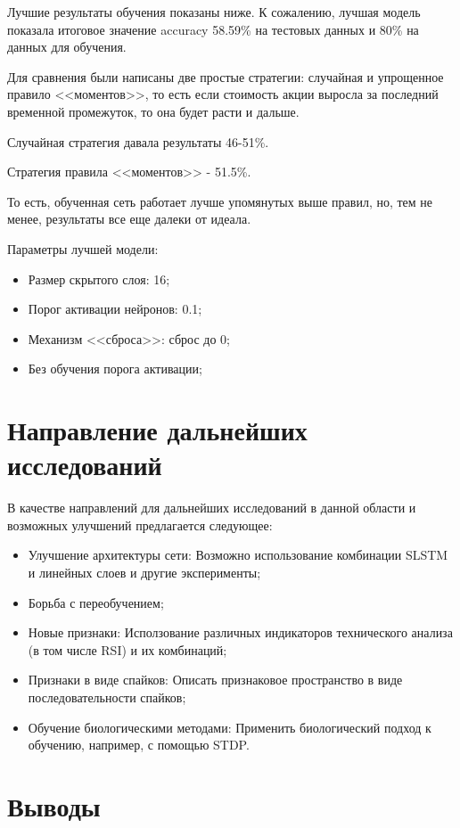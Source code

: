 \documentclass[a4paper,fontsize=12pt,titlepage,final]{scrartcl}
\begin{document}
Лучшие результаты обучения показаны ниже. К сожалению, лучшая модель показала итоговое значение accuracy 58.59\% на тестовых данных и 80\% на данных для обучения. 

Для сравнения были написаны две простые стратегии: случайная и упрощенное правило <<моментов>>, то есть если стоимость акции выросла за последний временной промежуток, то она будет расти и дальше. 

Случайная стратегия давала результаты 46-51\%.

Стратегия правила <<моментов>> - 51.5\%.

То есть, обученная сеть работает лучше упомянутых выше правил, но, тем не менее, результаты все еще далеки от идеала.

Параметры лучшей модели:

\begin{itemize}
    \item Размер скрытого слоя: 16;
    \item Порог активации нейронов: 0.1;
    \item Механизм <<сброса>>: сброс до 0;
    \item Без обучения порога активации;
\end{itemize}

\section{Направление дальнейших исследований}

В качестве направлений для дальнейших исследований в данной области и возможных улучшений предлагается следующее:

\begin{itemize}
    \item Улучшение архитектуры сети:
    Возможно использование комбинации SLSTM и линейных слоев и другие эксперименты;
    \item Борьба с переобучением;
    \item Новые признаки:
    Исползование различных индикаторов технического анализа (в том числе RSI) и их комбинаций;
    \item Признаки в виде спайков:
    Описать признаковое пространство в виде последовательности спайков;
    \item Обучение биологическими методами:
    Применить биологический подход к обучению, например, с помощью STDP.
\end{itemize}

\section{Выводы}
\end{document}
